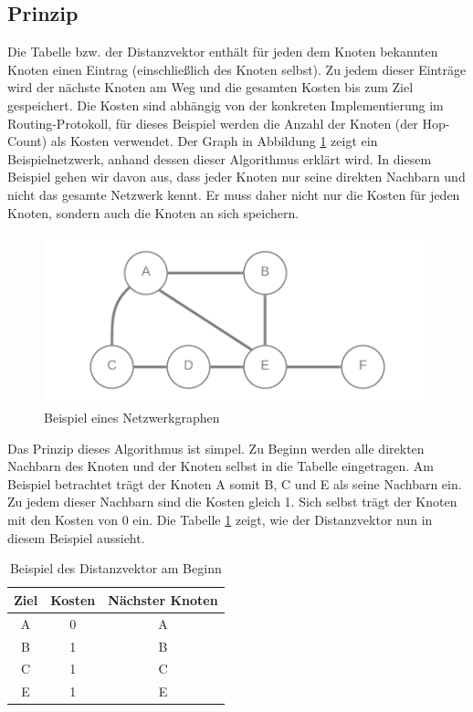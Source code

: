 \subsection{Prinzip}
Die Tabelle bzw. der Distanzvektor enthält für jeden dem Knoten bekannten Knoten einen Eintrag (einschließlich des Knoten selbst). Zu jedem dieser Einträge wird der nächste Knoten am Weg und die gesamten Kosten bis zum Ziel gespeichert. Die Kosten sind abhängig von der konkreten Implementierung im Routing-Protokoll, für dieses Beispiel werden die Anzahl der Knoten (der Hop-Count) als Kosten verwendet. Der Graph in Abbildung \ref{fig:network_graph} zeigt ein Beispielnetzwerk, anhand dessen dieser Algorithmus erklärt wird. In diesem Beispiel gehen wir davon aus, dass jeder Knoten nur seine direkten Nachbarn und nicht das gesamte Netzwerk kennt. Er muss daher nicht nur die Kosten für jeden Knoten, sondern auch die Knoten an sich speichern.

\begin{figure}
    \centering
    \includegraphics[width=\textwidth]{images/distance_vec_example_1.png}
    \caption{Beispiel eines Netzwerkgraphen}
    \label{fig:network_graph}
\end{figure}

Das Prinzip dieses Algorithmus ist simpel. Zu Beginn werden alle direkten Nachbarn des Knoten und der Knoten selbst in die Tabelle eingetragen. Am Beispiel betrachtet trägt der Knoten A somit B, C und E als seine Nachbarn ein. Zu jedem dieser Nachbarn sind die Kosten gleich 1. Sich selbst trägt der Knoten mit den Kosten von 0 ein. Die Tabelle \ref{example_start} zeigt, wie der Distanzvektor nun in diesem Beispiel aussieht.

\begin{table}
\caption{Beispiel des Distanzvektor am Beginn}
\label{example_start}
\centering
\begin{tabular}{| c | c | c |}
\hline
\textbf{Ziel} & \textbf{Kosten} & \textbf{Nächster Knoten} \\
\hline
A & 0 & A \\
\hline
B & 1 & B \\
\hline
C & 1 & C \\
\hline
E & 1 & E \\
\hline
\end{tabular}
\end{table}

